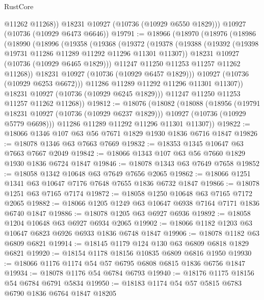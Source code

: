 \begin{lexlean}{RustCore}
\begin{coremodule}
          @11262
          @11268))
      @18231
      @10927
      (@10736 (@10929 @6550 @1829)))
    @10927
    (@10736 (@10929 @6473 @6646))
@19791 := @18966
    (@18970
      (@18976
        (@18986
          (@18990
            (@18996
              (@19358
                (@19368
                  (@19372
                    (@19378
                      (@19388
                        (@19392 (@19398 @19731 @11286 @11289 @11292 @11296 @11301 @11307))
                        @18231
                        @10927
                        (@10736 (@10929 @6465 @1829)))
                      @11247
                      @11250
                      @11253
                      @11257
                      @11262
                      @11268))
                  @18231
                  @10927
                  (@10736 (@10929 @6457 @1829)))
                @10927
                (@10736 (@10929 @6253 @6672)))
              @11286
              @11289
              @11292
              @11296
              @11301
              @11307))
          @18231
          @10927
          (@10736 (@10929 @6245 @1829)))
        @11247
        @11250
        @11253
        @11257
        @11262
        @11268))
@19812 := @18076
    (@18082
      (@18088
        (@18956
          (@19791 @18231 @10927 (@10736 (@10929 @6237 @1829)))
          @10927
          (@10736 (@10929 @5779 @6698)))
        @11286
        @11289
        @11292
        @11296
        @11301
        @11307))
@19822 := @18066 @1346 @107 @63 @56 @7671 @1829 @1930 @1836 @6716 @1847
@19826 := @18078 @1346 @63 @7663 @7669
@19832 := @18353 @1345 @10647 @63 @7663 @7667 @2049
@19842 := @18066 @1343 @107 @63 @56 @7660 @1829 @1930 @1836 @6724 @1847
@19846 := @18078 @1343 @63 @7649 @7658
@19852 := @18058 @1342 @10648 @63 @7649 @7656 @2065
@19862 := @18066 @1251 @1341 @63 @10647 @7176 @7648 @7655 @1836 @6732 @1847
@19866 := @18078 @1251 @63 @7165 @7174
@19872 := @18058 @1250 @10648 @63 @7165 @7172 @2065
@19882 := @18066 @1205 @1249 @63 @10647 @6938 @7164 @7171 @1836 @6740 @1847
@19886 := @18078 @1205 @63 @6927 @6936
@19892 := @18058 @1204 @10648 @63 @6927 @6934 @2065
@19902 := @18066 @1182 @1203 @63 @10647 @6823 @6926 @6933 @1836 @6748 @1847
@19906 := @18078 @1182 @63 @6809 @6821
@19914 := @18145 @1179 @124 @130 @63 @6809 @6818 @1829 @6821
@19920 := @18154 @1178 @18156 @10835 @6809 @6816 @1950
@19930 := @18066 @1176 @1174 @54 @57 @6795 @6808 @6815 @1836 @6756 @1847
@19934 := @18078 @1176 @54 @6784 @6793
@19940 := @18176 @1175 @18156 @54 @6784 @6791 @5834
@19950 := @18183 @1174 @54 @57 @5815 @6783 @6790 @1836 @6764 @1847 @18205

\end{coremodule}
\end{lexlean}
